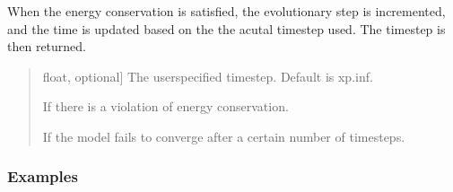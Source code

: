\documentclass[letterpaper,10pt,english]{sphinxmanual}
\begin{document}
\begin{fulllineitems}
\begin{fulllineitems}
\sphinxAtStartPar
When the energy conservation is satisfied, the evolutionary step is incremented, and the time is updated
based on the the acutal timestep used. The timestep is then returned.
\begin{quote}\begin{description}
\begin{description}
\sphinxlineitem{\sphinxstylestrong{userdt}}{[}float, optional{]}
\sphinxAtStartPar
The user\sphinxhyphen{}specified timestep. Default is xp.inf.

\end{description}

\begin{description}
\end{description}

\begin{description}
\sphinxAtStartPar
If there is a violation of energy conservation.

\sphinxAtStartPar
If the model fails to converge after a certain number of timesteps.

\end{description}

\end{description}\end{quote}
\subsubsection*{Examples}

\begin{sphinxVerbatim}[commandchars=\\\{\}]
  
\end{sphinxVerbatim}

\end{fulllineitems}


\end{fulllineitems}

\end{document}
